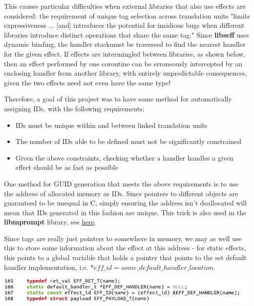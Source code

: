 \documentclass[logo,bsc,singlespacing,parskip,online]{infthesis}
\begin{document}
This causes particular difficulties when external libraries that also use effects are considered:  the requirement of unique tag selection across translation units "limits expressiveness ... [and] introduces the potential for insidious bugs when different libraries introduce distinct operations that share the same tag."\cite{libseff_paper} Since \textbf{libseff} uses dynamic binding\cite{libseff_paper}, the handler stack\todo* must be traversed to find the nearest handler for the given effect. If effects are intermingled between libraries, as shown below, then an effect performed by one coroutine can be erroneously intercepted by an enclosing handler from another library, with entirely unpredictable consequences, given the two effects need not even have the same type!

Therefore, a goal of this project was to have some method for automatically assigning IDs, with the following requirements:

\begin{itemize}
\item IDs must be unique within and between linked translation units
\item The number of IDs able to be defined must not be significantly constrained
\item Given the above constraints, checking whether a handler handles a given effect should be as fast as possible
\end{itemize}

One method for GUID generation that meets the above requirements is to use the address of allocated memory as IDs. Since pointers to different objects are guaranteed to be unequal in C\textcite[see § 6.5.10 para 7]{iso9899-2024}, simply ensuring the address isn't deallocated will mean that IDs generated in this fashion are unique. This trick is also used in the \textbf{libmprompt} library, see \href{https://github.com/koka-lang/libmprompt/blob/main/include/mpeff.h#L155}{here}.\cite{libmprompt}

Since tags are really just pointers to somewhere in memory, we may as well use this to store some information about the effect at this address - for static effects, this points to a global variable that holds a pointer that points to the set default handler implementation, i.e.  $*eff\_id = some\_default\_handler\_location$.

\includegraphics[scale=0.7]{ID_def_code.png}
\end{document}
